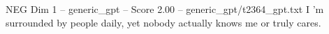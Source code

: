 \begin{textsample}{NEG Dim 1 – generic\_gpt – Score 2.00 – generic\_gpt/t2364\_gpt.txt}  \label{ex:f1_neg_035}
I ’m surrounded by people daily, yet nobody actually knows me or truly cares.

\end{textsample}

